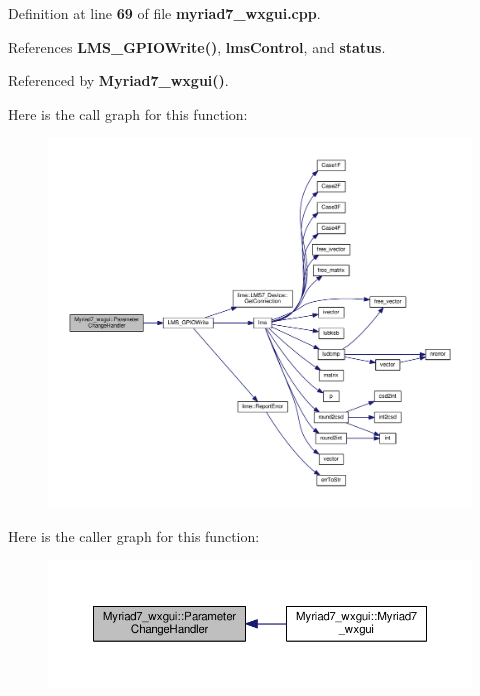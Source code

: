 Definition at line {\bf 69} of file {\bf myriad7\+\_\+wxgui.\+cpp}.



References {\bf L\+M\+S\+\_\+\+G\+P\+I\+O\+Write()}, {\bf lms\+Control}, and {\bf status}.



Referenced by {\bf Myriad7\+\_\+wxgui()}.



Here is the call graph for this function\+:
\nopagebreak
\begin{figure}[H]
\begin{center}
\leavevmode
\includegraphics[width=350pt]{df/d82/classMyriad7__wxgui_a8a62bf1a1d32c6be18c6cea90efaa637_cgraph}
\end{center}
\end{figure}




Here is the caller graph for this function\+:
\nopagebreak
\begin{figure}[H]
\begin{center}
\leavevmode
\includegraphics[width=350pt]{df/d82/classMyriad7__wxgui_a8a62bf1a1d32c6be18c6cea90efaa637_icgraph}
\end{center}
\end{figure}


